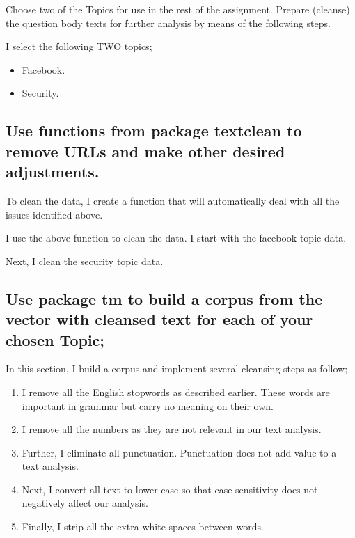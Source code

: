 \documentclass[
]{article}
\begin{document}
Choose two of the Topics for use in the rest of the assignment. Prepare
(cleanse) the question body texts for further analysis by means of the
following steps.

I select the following TWO topics;

\begin{itemize}
\item
  Facebook.
\item
  Security.
\end{itemize}

\hypertarget{use-functions-from-package-textclean-to-remove-urls-and-make-other-desired-adjustments.}{%
\subsection{Use functions from package textclean to remove URLs and make
other desired
adjustments.}\label{use-functions-from-package-textclean-to-remove-urls-and-make-other-desired-adjustments.}}

To clean the data, I create a function that will automatically deal with
all the issues identified above.

I use the above function to clean the data. I start with the facebook
topic data.

Next, I clean the security topic data.

\hypertarget{use-package-tm-to-build-a-corpus-from-the-vector-with-cleansed-text-for-each-of-your-chosen-topic}{%
\subsection{Use package tm to build a corpus from the vector with
cleansed text for each of your chosen
Topic;}\label{use-package-tm-to-build-a-corpus-from-the-vector-with-cleansed-text-for-each-of-your-chosen-topic}}

In this section, I build a corpus and implement several cleansing steps
as follow;

\begin{enumerate}
\def\labelenumi{\arabic{enumi}.}
\item
  I remove all the English stopwords as described earlier. These words
  are important in grammar but carry no meaning on their own.
\item
  I remove all the numbers as they are not relevant in our text
  analysis.
\item
  Further, I eliminate all punctuation. Punctuation does not add value
  to a text analysis.
\item
  Next, I convert all text to lower case so that case sensitivity does
  not negatively affect our analysis.
\item
  Finally, I strip all the extra white spaces between words.
\end{enumerate}
\end{document}
